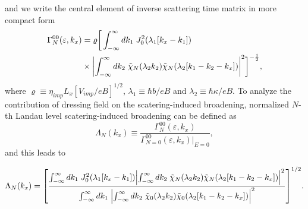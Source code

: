and we write the central element of inverse scattering time matrix in more compact form
\begin{equation} \label{eq_18}
  \begin{aligned}
    \Gamma^{00}_{N}(\varepsilon,k_x)  &=
    \varrho
    \bigg[
    \int_{-\infty}^{\infty} d {k}_1 \;
    J_0^2\qty(\lambda_1[{k}_x - {k}_1]) \\
    & \times
    \qty|
    \int_{-\infty}^{\infty} d{k}_2 \;
    \tilde{\chi}_{N}\qty(\lambda_2 k_2)
    \tilde{\chi}_{N}\qty(\lambda_2 \qty[{k}_1 - {k}_2 - {k}_x])|^2
    \bigg]^{-\frac{1}{2}},
  \end{aligned}
\end{equation}
where $\varrho \equiv \eta_{imp} L_x [ { V_{imp}}/{eB}]^{1/2}$, $ \lambda_1 \equiv \hbar b/eB$ and  $\lambda_2 \equiv \hbar \kappa/eB$.
To analyze the contribution of dressing field on the scatering-induced broadening, normalized $N$-th Landau level scatering-induced broadening can be defined as
\begin{equation} \label{eq_19}
    \Lambda_N(k_x) \equiv
    \frac{\Gamma^{00}_{N}(\varepsilon,k_x)}{\Gamma^{00}_{N=0}(\varepsilon,k_x)\big|_{E=0}},
\end{equation}
and this leads to
\begin{widetext}
\begin{equation} \label{eq_20}
    \Lambda_N (k_x) =
    \qty[
    \frac
    {\int_{-\infty}^{\infty} d {k}_1 \;
    J_0^2\qty(\lambda_1[{k}_x - {k}_1])
    \qty|
    \int_{-\infty}^{\infty} d{k}_2 \;
    \tilde{\chi}_{N}\qty(\lambda_2 k_2)
    \tilde{\chi}_{N}\qty(\lambda_2 \qty[{k}_1 - {k}_2 - {k}_x])|^2}
    {\int_{-\infty}^{\infty} d {k}_1 \;
    \qty|
    \int_{-\infty}^{\infty} d{k}_2 \;
    \tilde{\chi}_{0}\qty(\lambda_2 k_2)
    \tilde{\chi}_{0}\qty(\lambda_2 \qty[{k}_1 - {k}_2 - {k}_x])|^2}
    ]^{1/2}.
\end{equation}
\end{widetext}

